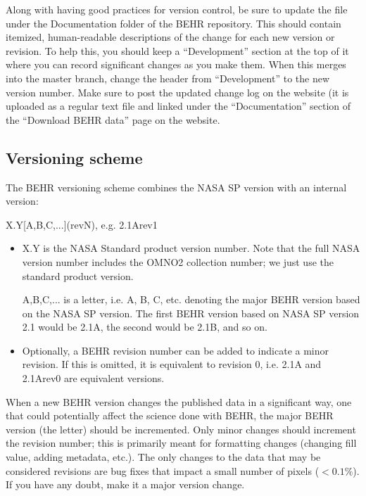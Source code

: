 \documentclass[12pt]{article}
\begin{document}
	Along with having good practices for version control, be sure to update the file  under the Documentation folder of the BEHR repository.  This should contain itemized, human-readable descriptions of the change for each new version or revision.  To help this, you should keep a ``Development'' section at the top of it where you can record significant changes as you make them.  When this merges into the master branch, change the header from ``Development'' to the new version number.  Make sure to post the updated change log on the website (it is uploaded as a regular text file and linked under the ``Documentation'' section of the ``Download BEHR data'' page on the website.
	
	\subsection{Versioning scheme}\label{sec:versioning-scheme}
	The BEHR versioning scheme combines the NASA SP version with an internal version:
	
	\begin{center}
	X.Y[A,B,C,...](revN), e.g. 2.1Arev1
	\end{center}
	
	\begin{itemize}
	\item X.Y is the NASA Standard product version number. Note that the full NASA version number includes the OMNO2 collection number; we just use the standard product version.
	\item [A,B,C,...] is a letter, i.e. A, B, C, etc. denoting the major BEHR version based on the NASA SP version. The first BEHR version based on NASA SP version 2.1 would be 2.1A, the second would be 2.1B, and so on.
	\item Optionally, a BEHR revision number can be added to indicate a minor revision. If this is omitted, it is equivalent to revision 0, i.e. 2.1A and 2.1Arev0 are equivalent versions.
	\end{itemize}
	
	When a new BEHR version changes the published data in a significant way, one that could potentially affect the science done with BEHR, the major BEHR version (the letter) should be incremented. Only minor changes should increment the revision number; this is primarily meant for formatting changes (changing fill value, adding metadata, etc.). The only changes to the data that may be considered revisions are bug fixes that impact a small number of pixels ($< 0.1\%$). If you have any doubt, make it a major version change.
	
\end{document}
